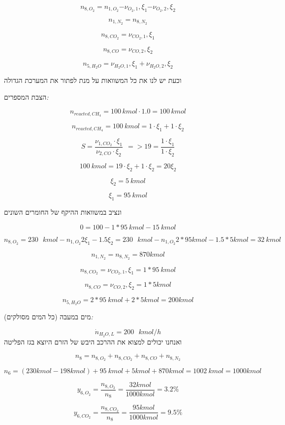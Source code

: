 \documentclass[
  hebrew,
  letterpaper,
  DIV=11,
  numbers=noendperiod]{scrreprt}
\begin{document}
\[n_{8,O_{2}} = n_{1,O_{2}}{- \nu}_{O_{2},1},\xi_{1}{- \nu}_{O_{2},2},\xi_{2}\]

\[n_{1,N_{2}} = n_{8,N_{2}}\]

\[n_{8,{CO}_{2}} = \nu_{CO_{2},1},\xi_{1}\]

\[n_{8,CO} = \nu_{CO,2},\xi_{2}\]

\[n_{5,H_{2}O} = \nu_{H_{2}O,1},\xi_{1} + \nu_{H_{2}O,2},\xi_{2}\]

\hfill\break

וכעת יש לנו את כל המשוואות על מנת לפתור את המערכת הגדולה

הצבת המספרים\emph{:}

\[n_{reacted,CH_{4}} = 100\, kmol \cdot 1.0 = 100\, kmol\]

\[n_{reacted,CH_{4}} = 100\ kmol = 1 \cdot \xi_{1} + 1 \cdot \xi_{2}\]

\[S = \frac{\nu_{1,CO_{2}} \cdot \xi_{1}}{\nu_{2,CO} \cdot \xi_{2}}\ \  = > 19 = \frac{1 \cdot \xi_{1}}{1 \cdot \xi_{2}}\]

\[100\ kmol = 19 \cdot \xi_{2} + 1 \cdot \xi_{2} = 20\xi_{2}\]

\[\xi_{2} = 5\ kmol\]

\[\xi_{1} = 95\ kmol\]

ונציב במשוואות ההיקף של החומרים השונים

\[0 = 100 - 1*95\ kmol - 15\ kmol\]

\[n_{8,O_{2}} = 230\text{ }kmol - n_{1,O_{2}}2\xi_{1} - 1.5\xi_{2} = 230\text{ }kmol - n_{1,O_{2}}2*95kmol - 1.5*5kmol = 32\ kmol\]

\[n_{1,N_{2}} = n_{8,N_{2}} = 870kmol\]

\[n_{8,{CO}_{2}} = \nu_{CO_{2},1},\xi_{1} = 1*95\ kmol\]

\[n_{8,CO} = \nu_{CO,2},\xi_{2} = 1*5kmol\]

\[n_{5,H_{2}O} = 2*95\ kmol + 2*5kmol = 200kmol\]

מים במעבה (כל המים מסולקים)\emph{:}

\[{\dot{n}}_{H_{2}O,L} = 200\text{ }kmol/h\] ואנחנו יכולים למצוא את
ההרכב היבש של הזרם היוצא בגז הפליטה

\[n_{8} = n_{8,O_{2}} + n_{8,{CO}_{2}} + n_{8,CO} + n_{8,N_{2}}\]

\[n_{6} = (230kmol - 198kmol) + 95\ kmol + 5kmol + 870kmol = 1002\ kmol = 1000kmol\]

\[y_{6,O_{2}} = \frac{n_{8,O_{2}}}{n_{8}} = \frac{32kmol}{1000kmol} = 3.2\%\]

\[y_{6,{CO}_{2}} = \frac{n_{8,{CO}_{2}}}{n_{8}} = \frac{95kmol}{1000kmol} = 9.5\%\]
\end{document}
